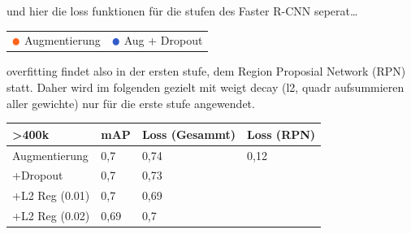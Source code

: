 und hier die loss funktionen für die stufen des Faster R-CNN 
seperat\dots

  \begin{minipage}{0.5\textwidth}
    \centering
    \label{plot:dropout_obj}
    \def\svgwidth{0.9\textwidth}
    
  \end{minipage}
  \begin{minipage}{0.5\textwidth}
    \centering
    \label{plot:dropout_class}
    \def\svgwidth{0.9\textwidth}
    
  \end{minipage}

\begin{table}[htb]
  \centering
  \begin{tabular}{m{}l}
    $\color[RGB]{255,100,30}\medbullet$  Augmentierung & $\color[RGB]{50,90,200}\medbullet$  Aug + Dropout
  \end{tabular}    
\end{table}

\vspace{1cm}

overfitting findet also in der ersten stufe, dem Region Proposial Network (RPN) statt.
Daher wird im folgenden gezielt mit weigt decay (l2, quadr aufsummieren aller gewichte)
nur für die erste stufe angewendet.


\begin{table}[htb]
  \centering
  \begin{tabular}{m{}|m{}<{\centering}m{}<{\centering}m{}<{\centering}}
  \hline
  \textgreater 400k & mAP  & Loss (Gesammt) & Loss (RPN) \\ \hline\hline
  Augmentierung     & 0,7  & 0,74           &  0,12          \\
  +Dropout          & 0,7  & 0,73           &            \\
  +L2 Reg (0.01)    & 0,7  & 0,69           &            \\
  +L2 Reg (0.02)    & 0,69 & 0,7            &            \\ \hline
  \end{tabular}
\end{table}

